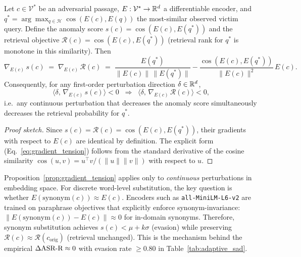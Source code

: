 \begin{proposition}
\label{prop:gradient_tension}
Let $c \in \mathcal{V}^*$ be an adversarial passage, $E : \mathcal{V}^* \to \mathbb{R}^d$
a differentiable encoder, and
$q^{*} = \arg\max_{q \in \mathcal{H}} \cos(E(c), E(q))$
the most-similar observed victim query.
Define the \sad{} anomaly score $s(c) = \cos(E(c), E(q^{*}))$
and the retrieval objective $\mathcal{R}(c) = \cos(E(c), E(q^{*}))$
(retrieval rank for $q^{*}$ is monotone in this similarity).
Then
\begin{equation}
  \nabla_{E(c)}\,s(c)
  \;=\;
  \nabla_{E(c)}\,\mathcal{R}(c)
  \;=\;
  \frac{E(q^{*})}{\|E(c)\|\,\|E(q^{*})\|}
    - \frac{\cos(E(c),E(q^{*}))}{\|E(c)\|^2}\,E(c).
  \label{eq:gradient_tension}
\end{equation}
Consequently, for any first-order perturbation direction $\delta \in \mathbb{R}^d$,
\begin{equation}
  \langle \delta,\, \nabla_{E(c)}\,s(c) \rangle < 0
  \;\;\Longrightarrow\;\;
  \langle \delta,\, \nabla_{E(c)}\,\mathcal{R}(c) \rangle < 0,
  \label{eq:gradient_tension_implication}
\end{equation}
i.e.\ any continuous perturbation that decreases the \sad{} anomaly score
simultaneously decreases the retrieval probability for $q^{*}$.
\end{proposition}

\begin{proof}[Proof sketch]
Since $s(c) = \mathcal{R}(c) = \cos(E(c), E(q^{*}))$, their gradients with
respect to $E(c)$ are identical by definition.
The explicit form (Eq.~\ref{eq:gradient_tension}) follows from the standard
derivative of the cosine similarity $\cos(u,v) = u^\top v / (\|u\|\|v\|)$
with respect to $u$.
\end{proof}

\begin{remark}
\label{rem:synonym}
Proposition~\ref{prop:gradient_tension} applies only to \emph{continuous}
perturbations in embedding space.  For discrete word-level substitution, the
key question is whether $E(\mathrm{synonym}(c)) \approx E(c)$.
Encoders such as \texttt{all-MiniLM-L6-v2} are trained on paraphrase
objectives that explicitly enforce synonym-invariance:
$\|E(\mathrm{synonym}(c)) - E(c)\| \approx 0$ for in-domain synonyms.
Therefore, synonym substitution achieves $s(c) < \mu + k\sigma$ (evasion)
while preserving $\mathcal{R}(c) \approx \mathcal{R}(c_{\mathrm{orig}})$
(retrieval unchanged).  This is the mechanism behind the empirical
$\Delta\text{ASR-R} \approx 0$ with evasion rate $\geq 0.80$ in
Table~\ref{tab:adaptive_sad}.
\end{remark}


